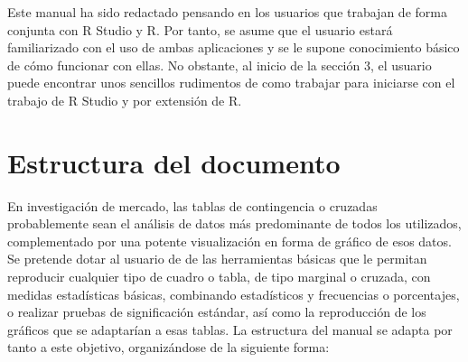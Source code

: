 \documentclass[
]{book}
\begin{document}
Este manual ha sido redactado pensando en los usuarios que trabajan de forma conjunta con R Studio y R. Por tanto, se asume que el usuario estará familiarizado con el uso de ambas aplicaciones y se le supone conocimiento básico de cómo funcionar con ellas. No obstante, al inicio de la sección 3, el usuario puede encontrar unos sencillos rudimentos de como trabajar para iniciarse con el trabajo de R Studio y por extensión de R.

\hypertarget{estructura-del-documento}{%
\section{Estructura del documento}\label{estructura-del-documento}}

En investigación de mercado, las tablas de contingencia o cruzadas probablemente sean el análisis de datos más predominante de todos los utilizados, complementado por una potente visualización en forma de gráfico de esos datos. Se pretende dotar al usuario de de las herramientas básicas que le permitan reproducir cualquier tipo de cuadro o tabla, de tipo marginal o cruzada, con medidas estadísticas básicas, combinando estadísticos y frecuencias o porcentajes, o realizar pruebas de significación estándar, así como la reproducción de los gráficos que se adaptarían a esas tablas. La estructura del manual se adapta por tanto a este objetivo, organizándose de la siguiente forma:
\end{document}
